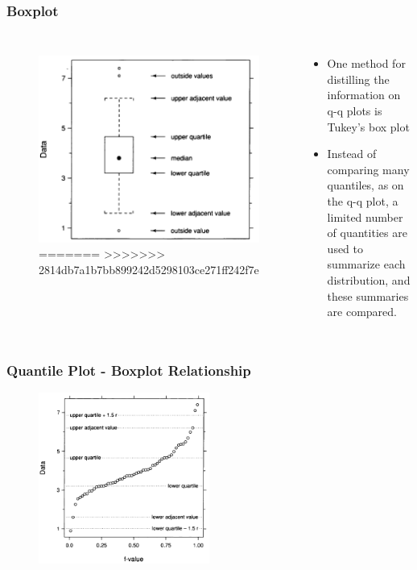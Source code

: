 \documentclass[aspectratio=1610]{beamer}
\begin{document}
\begin{frame}
	\frametitle{Boxplot}
	\begin{columns}
		\begin{figure}
			\begin{center}
				\includegraphics[width=1.0\textwidth]{figures/boxplot.png}
=======
>>>>>>> 2814db7a1b7bb899242d5298103ce271ff242f7e
			\end{center}
		\end{figure}
		\begin{itemize}
			\item One method for distilling the information on q-q plots is Tukey's box
			      plot
			\item Instead of comparing many quantiles, as on the q-q plot, a
			      limited number of quantities are used to summarize each distribution, and
			      these summaries are compared.
		\end{itemize}
	\end{columns}
\end{frame}

\begin{frame}
	\frametitle{Quantile Plot - Boxplot Relationship}
	\begin{figure}
		\begin{center}
			\includegraphics[width=0.5\textwidth]{figures/boxplot_explained.png}
		\end{center}
	\end{figure}
\end{frame}
\end{document}
